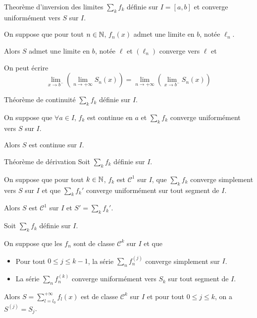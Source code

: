 \documentclass[a4paper,12pt]{article}
\begin{document}
\begin{theoreme}{Theorème d'inversion des limites}{}
    $\sum_k f_k$ définie sur $I = [a, b]$ et converge uniformément vers $S$ sur $I$.

    On suppose que pour tout $n \in \mathbb{N}$, $f_n(x)$ admet une limite en $b$, notée $\ell_n$.

    Alors $S$ admet une limite en $b$, notée $\ell$ et $(\ell_n)$ converge vers $\ell$ et
\end{theoreme}

\begin{remarque}
    On peut écrire
    $$
    \lim\limits_{x \to b^-} \left( \lim\limits_{n \to +\infty} S_n(x) \right) = \lim\limits_{n \to +\infty} \left( \lim\limits_{x \to b^-} S_n(x) \right)
    $$
\end{remarque}

\begin{theoreme}{Théorème de continuité}{}
    $\sum_k f_k$ définie sur $I$.

    On suppose que $\forall a \in I$, $f_k$ est continue en $a$ et $\sum_k f_k$ converge uniformément vers $S$ sur $I$.

    Alors $S$ est continue sur $I$.
\end{theoreme}

\begin{theoreme}{Théorème de dérivation}{}
    Soit $\sum_k f_k$ définie sur $I$.

    On suppose que pour tout $k \in \mathbb{N}$, $f_k$ est $\mathcal{C}^1$ sur $I$, que $\sum_k f_k$ converge simplement vers $S$ sur $I$ et que $\sum_k f_k'$ converge uniformément sur tout segment de $I$.

    Alors $S$ est $\mathcal{C}^1$ sur $I$ et $S' = \sum_k f_k'$.
\end{theoreme}

\begin{proposition}{}{}
    Soit $\sum_k f_k$ définie sur $I$.

    On suppose que les $f_n$ sont de classe $\mathcal{C}^k$ sur $I$ et que
    \begin{itemize}[label=--]
        \item Pour tout $0 \leq j \leq k - 1$, la série $\sum_n f_n^{(j)}$ converge simplement sur $I$.
        \item La série $\sum_n f_n^{(k)}$ converge uniformément vers $S_k$ sur tout segment de $I$.
    \end{itemize}
    Alors $S = \sum_{l = l_0}^{+\infty} f_l(x)$ est de classe $\mathcal{C}^k$ sur $I$ et pour tout $0 \leq j \leq k$, on a $S^{(j)} = S_j$.
\end{proposition}
\end{document}
